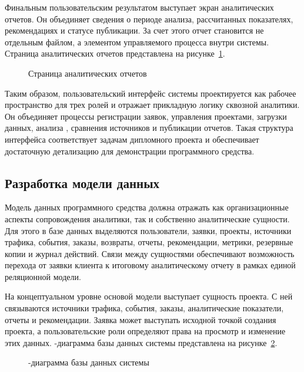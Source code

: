 Финальным пользовательским результатом выступает экран аналитических отчетов. Он объединяет сведения о периоде анализа, рассчитанных показателях, рекомендациях и статусе публикации. За счет этого отчет становится не отдельным файлом, а элементом управляемого процесса внутри системы. Страница аналитических отчетов представлена на рисунке~\ref{fig:analytics-reports-page}.

\begin{figure}[H]
    \centering
    \caption{Страница аналитических отчетов}
    \label{fig:analytics-reports-page}
\end{figure}

Таким образом, пользовательский интерфейс системы проектируется как рабочее пространство для трех ролей и отражает прикладную логику сквозной аналитики. Он объединяет процессы регистрации заявок, управления проектами, загрузки данных, анализа , сравнения источников и публикации отчетов. Такая структура интерфейса соответствует задачам дипломного проекта и обеспечивает достаточную детализацию для демонстрации программного средства.

\subsection{Разработка модели данных}

Модель данных программного средства должна отражать как организационные аспекты сопровождения аналитики, так и собственно аналитические сущности. Для этого в базе данных выделяются пользователи, заявки, проекты, источники трафика, события, заказы, возвраты, отчеты, рекомендации, метрики, резервные копии и журнал действий. Связи между сущностями обеспечивают возможность перехода от заявки клиента к итоговому аналитическому отчету в рамках единой реляционной модели.

На концептуальном уровне основой модели выступает сущность проекта. С ней связываются источники трафика, события, заказы, аналитические показатели, отчеты и рекомендации. Заявка может выступать исходной точкой создания проекта, а пользовательские роли определяют права на просмотр и изменение этих данных. -диаграмма базы данных системы представлена на рисунке~\ref{fig:er-database}.

\begin{figure}[H]
    \centering
    \caption{-диаграмма базы данных системы}
    \label{fig:er-database}
\end{figure}

